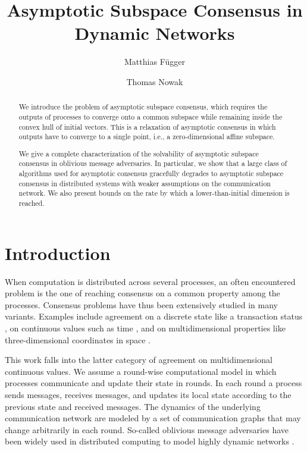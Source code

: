 \documentclass[a4paper,USenglish]{lipics-v2021}
\title{Asymptotic Subspace Consensus in Dynamic Networks}
\author{Matthias {Függer}}{Université Paris-Saclay, CNRS, ENS Paris-Saclay, LMF, Gif-sur-Yvette, France \and \url{https://home.lmf.cnrs.fr/MatthiasFuegger/} }{mfuegger@lmf.cnrs.fr}{https://orcid.org/0000-0001-5765-0301}{}
\author{Thomas {Nowak}}{Université Paris-Saclay, CNRS, ENS Paris-Saclay, LMF, Gif-sur-Yvette, France \and Institut Universitaire de France, Paris, France \and \url{https://www.thomasnowak.net}}{thomas@thomasnowak.net}{https://orcid.org/0000-0003-1690-9342}{}
\begin{document}
\maketitle

\begin{abstract}
	We introduce the problem of asymptotic subspace consensus, which requires the outputs of processes to converge onto a common subspace while remaining inside the convex hull of initial vectors.
	This is a relaxation of asymptotic consensus in which outputs have to converge to a single point, i.e., a zero-dimensional affine subspace.

	We give a complete characterization of the solvability of asymptotic subspace consensus in oblivious message adversaries.
	In particular, we show that a large class of algorithms used for asymptotic consensus gracefully degrades to asymptotic subspace consensus in distributed systems with weaker assumptions on the communication network.
	We also present bounds on the rate by which a lower-than-initial dimension is reached.
\end{abstract}


\section{Introduction}

When computation is distributed across several processes, an often encountered problem is the one of reaching consensus on a common property among the processes.
Consensus problems have thus been extensively studied in many variants.
Examples include agreement on a discrete state like a transaction status \cite{Lamport82,schneider1990implementing}, on continuous values such as time \cite{Hal84,srikanth87,LL88,dolev2004self,kopetz2009clock}, and on multidimensional properties like three-dimensional coordinates in space \cite{Bal05,murray2007recent,mendes15:multidimensional,FN18:disc}.

This work falls into the latter category of agreement on multidimensional continuous values.
We assume a round-wise computational model in which processes communicate and update their state in rounds.
In each round a process sends messages, receives messages, and updates its local state according to the previous state and received messages.
The dynamics of the underlying communication network are modeled by a set of communication graphs that may change arbitrarily in each round.
So-called oblivious message adversaries have been widely used in distributed computing to model highly dynamic networks \cite{SW89,charron09:HO,afek13:asynchrony,CG15}.
\end{document}
